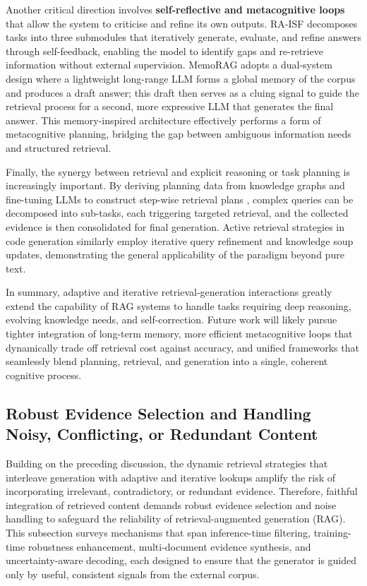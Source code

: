 \documentclass[11pt,a4paper]{article}
\begin{document}
Another critical direction involves \textbf{self-reflective and metacognitive loops} that allow the system to criticise and refine its own outputs. RA-ISF \cite{arxiv:2403.06840v1} decomposes tasks into three submodules that iteratively generate, evaluate, and refine answers through self-feedback, enabling the model to identify gaps and re-retrieve information without external supervision. MemoRAG \cite{arxiv:2409.05591v2} adopts a dual-system design where a lightweight long-range LLM forms a global memory of the corpus and produces a draft answer; this draft then serves as a cluing signal to guide the retrieval process for a second, more expressive LLM that generates the final answer. This memory-inspired architecture effectively performs a form of metacognitive planning, bridging the gap between ambiguous information needs and structured retrieval.

Finally, the synergy between retrieval and explicit reasoning or task planning is increasingly important. By deriving planning data from knowledge graphs and fine-tuning LLMs to construct step-wise retrieval plans \cite{arxiv:2406.14282v1}, complex queries can be decomposed into sub-tasks, each triggering targeted retrieval, and the collected evidence is then consolidated for final generation. Active retrieval strategies in code generation \cite{arxiv:2402.12317v1} similarly employ iterative query refinement and knowledge soup updates, demonstrating the general applicability of the paradigm beyond pure text.

In summary, adaptive and iterative retrieval-generation interactions greatly extend the capability of RAG systems to handle tasks requiring deep reasoning, evolving knowledge needs, and self-correction. Future work will likely pursue tighter integration of long-term memory, more efficient metacognitive loops that dynamically trade off retrieval cost against accuracy, and unified frameworks that seamlessly blend planning, retrieval, and generation into a single, coherent cognitive process.


\subsection{Robust Evidence Selection and Handling Noisy, Conflicting, or Redundant Content}


Building on the preceding discussion, the dynamic retrieval strategies that interleave generation with adaptive and iterative lookups amplify the risk of incorporating irrelevant, contradictory, or redundant evidence. Therefore, faithful integration of retrieved content demands robust evidence selection and noise handling to safeguard the reliability of retrieval-augmented generation (RAG). This subsection surveys mechanisms that span inference-time filtering, training-time robustness enhancement, multi-document evidence synthesis, and uncertainty-aware decoding, each designed to ensure that the generator is guided only by useful, consistent signals from the external corpus.
\end{document}
